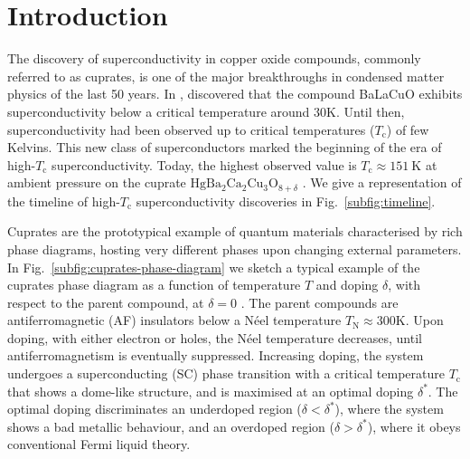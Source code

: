 \def\GraphicsFolder{chapters/theoretical-introduction/pictures}
\chapter{Introduction}\label{chap:theoretical-introduction}

The discovery of superconductivity in copper oxide compounds, commonly referred to as cuprates, is one of the major breakthroughs in condensed matter physics of the last 50 years. In \citeyear{bednorz1986possible}, \citeauthor{bednorz1986possible} \cite{bednorz1986possible} discovered that the compound BaLaCuO exhibits superconductivity below a critical temperature around $30 \mathrm{K}$. Until then, superconductivity had been observed  up to critical temperatures ($T_\mathrm{c}$) of few Kelvins. This new class of superconductors marked the beginning of the era of high-$T_\mathrm{c}$ superconductivity. Today, the highest observed value is $T_\mathrm{c} \approx 151~\mathrm{K}$ at ambient pressure on the cuprate $\mathrm{Hg}\mathrm{Ba}_2 \mathrm{Ca}_2 \mathrm{Cu}_3 \mathrm{O}_{8+\delta}$ \cite{deng2026ambient}. We give a representation of the timeline of high-$T_\mathrm{c}$ superconductivity discoveries in Fig.~\ref{subfig:timeline}.

Cuprates are the prototypical example of quantum materials characterised by rich phase diagrams, hosting very different phases upon changing external parameters. In Fig.~\ref{subfig:cuprates-phase-diagram} we sketch a typical example of the cuprates phase diagram as a function of temperature $T$ and doping $\delta$, with respect to the parent compound, at $\delta=0$ \cite{keimer2015quantum}. The parent compounds are antiferromagnetic (AF) insulators below a Néel temperature $T_\mathrm{N} \approx 300 \mathrm{K}$. Upon doping, with either electron or holes, the Néel temperature decreases, until antiferromagnetism is eventually suppressed. Increasing doping, the system undergoes a superconducting (SC) phase transition with a critical temperature $T_\mathrm{c}$ that shows a dome-like structure, and is maximised at an optimal doping $\delta^*$. The optimal doping discriminates an underdoped region ($\delta < \delta^*$), where the system shows a bad metallic behaviour, and an overdoped region ($\delta > \delta^*$), where it obeys conventional Fermi liquid theory.

